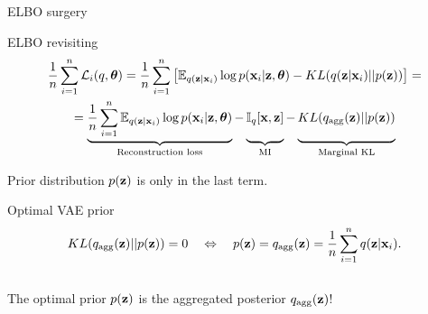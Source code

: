 \begin{frame}{ELBO surgery}
	\begin{block}{ELBO revisiting}
		\vspace{-0.7cm}
		\begin{multline*}
		    \frac{1}{n}\sum_{i=1}^n \cL_i(q, \btheta) = \frac{1}{n} \sum_{i=1}^n \left[ \mathbb{E}_{q(\bz | \bx_i)} \log p(\bx_i | \bz, \btheta) - KL(q(\bz | \bx_i) || p(\bz)) \right] = \\
		    = \underbrace{\frac{1}{n} \sum_{i=1}^n \mathbb{E}_{q(\bz | \bx_i)} \log p(\bx_i | \bz, \btheta)}_{\text{Reconstruction loss}} - \underbrace{\vphantom{ \sum_{i=1}^n} \bbI_q [\bx, \bz]}_{\text{MI}} - \underbrace{\vphantom{ \sum_{i=1}^n} KL(q_{\text{agg}}(\bz) || p(\bz))}_{\text{Marginal KL}}
		\end{multline*}
		\vspace{-0.3cm}
	\end{block}
	Prior distribution $p(\mathbf{z})$ is only in the last term.
	\begin{block}{Optimal VAE prior}
		\vspace{-0.7cm}
		\[
	  		KL(q_{\text{agg}}(\mathbf{z}) || p(\mathbf{z})) = 0 \quad \Leftrightarrow \quad p (\mathbf{z}) = q_{\text{agg}}(\mathbf{z}) = \frac{1}{n} \sum_{i=1}^n q(\mathbf{z} | \mathbf{x}_i).
		\]
		\vspace{-0.4cm} \\
		The optimal prior $p(\mathbf{z})$ is the aggregated posterior $q_{\text{agg}}(\mathbf{z})$!
	\end{block}
	
\end{frame}
